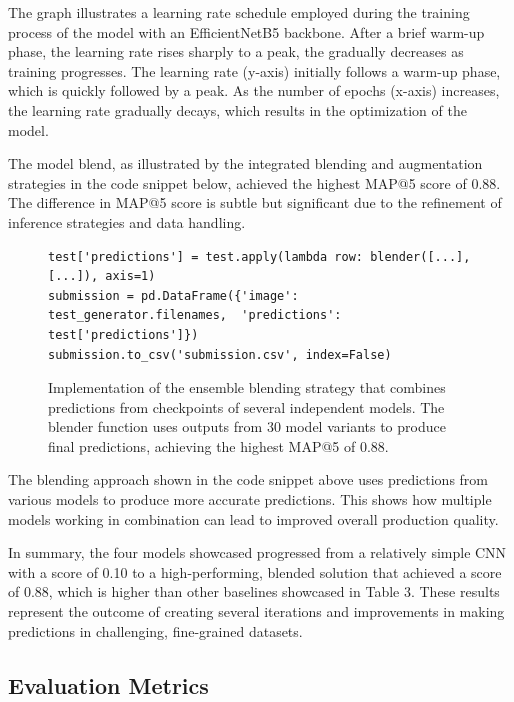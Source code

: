 \documentclass[twocolumn]{article}
\begin{document}
The graph illustrates a learning rate schedule employed during the training process of the model with an EfficientNetB5 backbone. After a brief warm-up phase, the learning rate rises sharply to a peak, the gradually decreases as training progresses. The learning rate (y-axis) initially follows a warm-up phase, which is quickly followed by a peak. As the number of epochs (x-axis) increases, the learning rate gradually decays, which results in the optimization of the model. 

The model blend, as illustrated by the integrated blending and augmentation strategies in the code snippet below, achieved the highest MAP@5 score of 0.88. The difference in MAP@5 score is subtle but significant due to the refinement of inference strategies and data handling.

\begin{figure}[h!]
\centering
\begin{minipage}{0.99\linewidth}
\begin{lstlisting}
test['predictions'] = test.apply(lambda row: blender([...], [...]), axis=1)
submission = pd.DataFrame({'image': test_generator.filenames,  'predictions': test['predictions']})
submission.to_csv('submission.csv', index=False)
\end{lstlisting}
\end{minipage}
\caption{Implementation of the ensemble blending strategy that combines predictions from checkpoints of several independent models. The blender function uses outputs from 30 model variants to produce final predictions, achieving the highest MAP@5 of 0.88.}
\end{figure}

The blending approach shown in the code snippet above uses predictions from various models to produce more accurate predictions. This shows how multiple models working in combination can lead to improved overall production quality.

In summary, the four models showcased progressed from a relatively simple CNN with a score of 0.10 to a high-performing, blended solution that achieved a score of 0.88, which is higher than other baselines showcased in Table 3. These results represent the outcome of creating several iterations and improvements in making predictions in challenging, fine-grained datasets.

\subsection{Evaluation Metrics}
\end{document}

